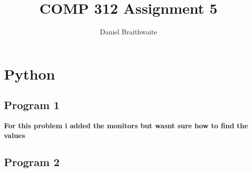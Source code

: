 \documentclass{article}
\title{COMP 312 Assignment 5}
\author{Daniel Braithwaite}
\begin{document}
	\maketitle
	\newpage
  	
  	\section{Python}
  		\subsection{Program 1}
  			
  			
  			\textbf{For this problem i added the monitors but wasnt sure how to find the values}
  			
  		\subsection{Program 2}
  			
  			
\end{document}
